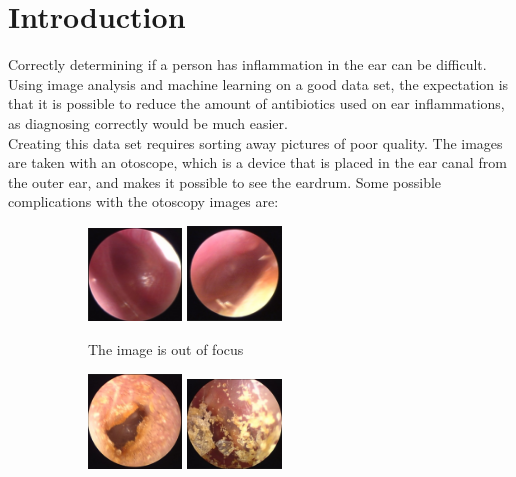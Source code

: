 \section{Introduction}
Correctly determining if a person has inflammation in the ear can be difficult. Using image analysis and machine learning on a good data set, the expectation is that it is possible to reduce the amount of antibiotics used on ear inflammations, as diagnosing correctly would be much easier.\\
Creating this data set requires sorting away pictures of poor quality. The images are taken with an otoscope, which is a device that is placed in the ear canal from the outer ear, and makes it possible to see the eardrum. Some possible complications with the otoscopy images are:

\begin{figure}[H]
    \centering
    \begin{subfigure}[t]{0.32\textwidth}
        \centering
        \includegraphics[width=2.5cm]{Figures/Intro/ear5.png}
        \includegraphics[width=2.5cm]{Figures/Intro/ear6.png}
        \caption{The image is out of focus}
        \label{fig:intro_blur}
    \end{subfigure}
    \begin{subfigure}[t]{0.32\textwidth}
        \centering
        \includegraphics[width=2.5cm]{Figures/Intro/ear3.png}
        \includegraphics[width=2.5cm]{Figures/Intro/ear4.png}

\end{subfigure}
\end{figure}
